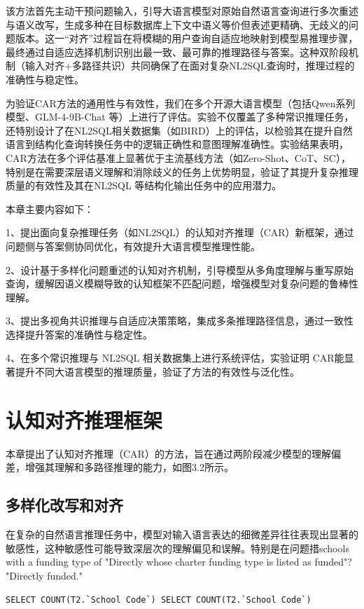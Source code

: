 \documentclass[12pt,a4paper,openright,UTF8]{ctexbook}
\begin{document}
该方法首先主动干预问题输入，引导大语言模型对原始自然语言查询进行多次重述与语义改写，生成多种在目标数据库上下文中语义等价但表述更精确、无歧义的问题版本。这一“对齐”过程旨在将模糊的用户查询自适应地映射到模型易推理步骤，最终通过自适应选择机制识别出最一致、最可靠的推理路径与答案。这种双阶段机制（输入对齐+多路径共识）共同确保了在面对复杂NL2SQL查询时，推理过程的准确性与稳定性。


为验证CAR方法的通用性与有效性，我们在多个开源大语言模型（包括Qwen系列模型、GLM-4-9B-Chat 等）上进行了评估。实验不仅覆盖了多种常识推理任务，还特别设计了在NL2SQL相关数据集（如BIRD）上的评估，以检验其在提升自然语言到结构化查询转换任务中的逻辑正确性和意图理解准确性。实验结果表明，CAR方法在多个评估基准上显著优于主流基线方法（如Zero-Shot、CoT、SC），特别是在需要深层语义理解和消除歧义的任务上优势明显，验证了其提升复杂推理质量的有效性及其在NL2SQL 等结构化输出任务中的应用潜力。


本章主要内容如下：


1、提出面向复杂推理任务（如NL2SQL）的认知对齐推理（CAR）新框架，通过问题侧与答案侧协同优化，有效提升大语言模型推理性能。


2、设计基于多样化问题重述的认知对齐机制，引导模型从多角度理解与重写原始查询，缓解因语义模糊导致的认知框架不匹配问题，增强模型对复杂问题的鲁棒性理解。


3、提出多视角共识推理与自适应决策策略，集成多条推理路径信息，通过一致性选择提升答案的准确性与稳定性。


4、在多个常识推理与 NL2SQL 相关数据集上进行系统评估，实验证明 CAR能显著提升不同大语言模型的推理质量，验证了方法的有效性与泛化性。

\section{认知对齐推理框架}

本章提出了认知对齐推理（CAR）的方法，旨在通过两阶段减少模型的理解偏差，增强其理解和多路径推理的能力，如图3.2所示。

\subsection{多样化改写和对齐}

在复杂的自然语言推理任务中，模型对输入语言表达的细微差异往往表现出显著的敏感性，这种敏感性可能导致深层次的理解偏见和误解。特别是在问题措schools with a funding type of "Directly whose charter funding type is listed as funded"? "Directly funded."

\begin{lstlisting}
SELECT COUNT(T2.`School Code`) SELECT COUNT(T2.`School Code`)
\end{lstlisting}
\end{document}
